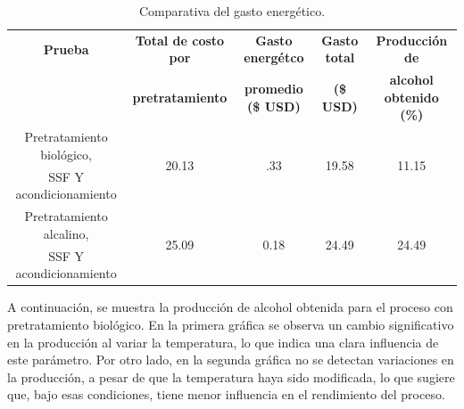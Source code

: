 \documentclass[12pt]{article}
\begin{document}
	
	\begin{table}[H]
		\centering
		\caption{Comparativa del gasto energético.}
		\label{energi_2}
		{\fontsize{8}{11}\selectfont
			\begin{tabular}{|c|c|c|c|c|}
				\hline
			\textbf{Prueba} & \textbf{Total de costo por} &\textbf{ Gasto energétco}  & \textbf{Gasto total} & \textbf{Producción de} \\ 
				~ &  \textbf{pretratamiento} & \textbf{ promedio (\$ USD)} & \textbf{  (\$ USD)} &\textbf{  alcohol obtenido (\%)  }\\ \hline
				
		
			    Pretratamiento biológico, &  \multirow{2}{*}{20.13} & \multirow{2}{*}{.33}&\multirow{2}{*}{19.58} & \multirow{2}{*}{11.15}  \\ 
			     SSF Y acondicionamiento &  &&&   \\ \hline
			
			
  Pretratamiento alcalino, &  \multirow{2}{*}{25.09} & \multirow{2}{*}{0.18}&\multirow{2}{*}{24.49} & \multirow{2}{*}{24.49}  \\ 
SSF Y acondicionamiento &  &&&   \\ \hline
 
			
		\end{tabular}	}
	\end{table}
	
	
	

	
			
		A continuación, se muestra la producción de alcohol obtenida para el proceso con pretratamiento biológico. En la primera gráfica se observa un cambio significativo en la producción al variar la temperatura, lo que indica una clara influencia de este parámetro. Por otro lado, en la segunda gráfica no se detectan variaciones en la producción, a pesar de que la temperatura haya sido modificada, lo que sugiere que, bajo esas condiciones, tiene menor influencia en el rendimiento del proceso.
			
\end{document}
